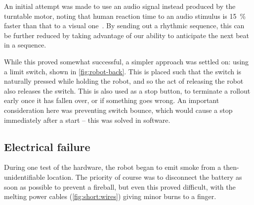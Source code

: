 \documentclass[main.tex]{subfiles}
\begin{document}
	An initial attempt was made to use an audio signal instead produced by the turntable motor, noting that human reaction time to an audio stimulus is \SI{15}{\percent} faster than that to a visual one~\cite{reaction}.
	By sending out a rhythmic sequence, this can be further reduced by taking advantage of our ability to anticipate the next beat in a sequence.

	While this proved somewhat successful, a simpler approach was settled on: using a limit switch, shown in \cref{fig:robot-back}.
	This is placed such that the switch is naturally pressed while holding the robot, and so the act of releasing the robot also releases the switch.
	This is also used as a stop button, to terminate a rollout early once it has fallen over, or if something goes wrong\footnotemark.
	An important consideration here was preventing switch bounce, which would cause a stop immediately after a start -- this was solved in software.


\subsection{Electrical failure}
	\label{sec:electrical:failure}

	During one test of the hardware, the robot began to emit smoke from a then-unidentifiable location. The priority of course was to disconnect the battery as soon as possible to prevent a fireball, but even this proved difficult, with the melting power cables (\cref{fig:short:wires}) giving minor burns to a finger.
\end{document}
